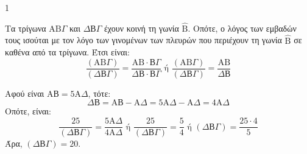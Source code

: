 \begin{ylh}{1}
    \item [Ύλη από εικόνα]
\end{ylh}
\begin{figure} %
\end{figure}
\begin{alist}
\item Τα τρίγωνα $\text{ΑΒ}\Gamma$ και $\Delta\text{В}\Gamma$ έχουν κοινή τη γωνία $\hat{\text{B}}$. Οπότε, ο λόγος των εμβαδών τους ισούται με τον λόγο των γινομένων των πλευρών που περιέχουν τη γωνία $\hat{\text{B}}$ σε καθένα από τα τρίγωνα. Έτσι είναι:
\[ \frac{(\text{ΑΒ}\Gamma)}{(\Delta\text{В}\Gamma)} = \frac{\text{ΑΒ} \cdot \text{В}\Gamma}{\Delta\text{В} \cdot \text{В}\Gamma} \text{ ή } \frac{(\text{ΑΒ}\Gamma)}{(\Delta\text{В}\Gamma)} = \frac{\text{ΑΒ}}{\Delta\text{В}} \]

\item Αφού είναι $\text{ΑВ} = 5\text{Α}\Delta$, τότε:
\[ \Delta\text{В} = \text{ΑВ} - \text{Α}\Delta = 5\text{Α}\Delta - \text{Α}\Delta = 4\text{Α}\Delta \]
Οπότε, είναι:
\[ \frac{25}{(\Delta\text{В}\Gamma)} = \frac{5\text{Α}\Delta}{4\text{Α}\Delta} \text{ ή } \frac{25}{(\Delta\text{В}\Gamma)} = \frac{5}{4} \text{ ή } (\Delta\text{В}\Gamma) = \frac{25 \cdot 4}{5} \]
Άρα, $(\Delta\text{В}\Gamma) = 20.$
\end{alist}